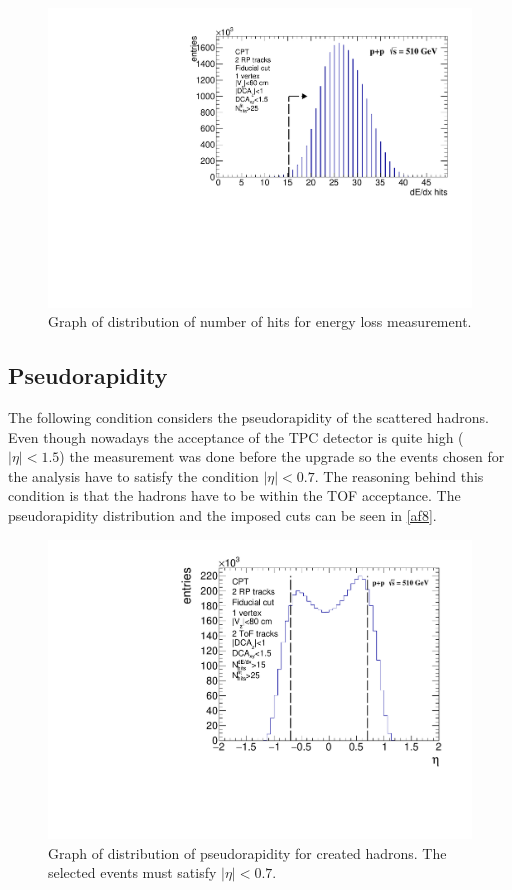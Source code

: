 \FloatBarrier
\begin{figure}[ht]
    \centering
    \includegraphics[width=1\textwidth]{figures/hNhitsDEdx.pdf}
    \caption[Distribution of number of hits in TPC for energy loss measurement]{Graph of distribution of number of hits for energy loss measurement.}
    \label{af16}
\end{figure}
\FloatBarrier

\subsection{Pseudorapidity}
The following condition considers the pseudorapidity of the scattered hadrons. Even though nowadays the acceptance of the TPC detector is quite high ($|\eta| < 1.5$) the measurement was done before the upgrade so the events chosen for the analysis have to satisfy the condition $|\eta|<0.7$. The reasoning behind this condition is that the hadrons have to be within the TOF acceptance. The pseudorapidity distribution and the imposed cuts can be seen in \autoref{af8}.

\FloatBarrier
\begin{figure}[ht]
    \centering
    \includegraphics[width=1\textwidth]{figures/hEta.pdf}
    \caption[Distribution of pseudorapidity of measured hadrons]{Graph of distribution of pseudorapidity for created hadrons. The selected events must satisfy $|\eta| < 0.7$. }
    \label{af8}
\end{figure}
\FloatBarrier

